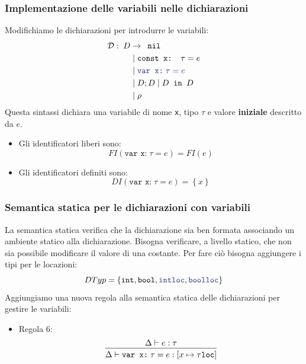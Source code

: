 \documentclass[a4paper]{article}
\begin{document}
\subsubsection{Implementazione delle variabili nelle dichiarazioni}
Modifichiamo le dichiarazioni per introdurre le variabili:
\[
  \begin{aligned}
    \mathcal{D}: \; D & \to  \texttt{ nil}  \\
                      & \mid \texttt{const x: } \tau = e  \\
                      & \mid \mathcolor{Blue}{\texttt{var x:}\; \tau = e} \\
                      & \mid D; D  \mid D \texttt{ in } D \\
                      & \mid \rho
  \end{aligned}
\] 
Questa sintassi dichiara una variabile di nome \texttt{x}, tipo \( \tau \) e valore
\textbf{iniziale} descritto da \( e \).
\begin{itemize}
  \item Gli identificatori liberi sono:
    \[
      FI(\texttt{var x:}\; \tau = e) = FI(e)
    \] 

  \item Gli identificatori definiti sono:
    \[
      DI(\texttt{var x:}\; \tau = e) = \left\{ x \right\}
    \]
\end{itemize}

\subsubsection{Semantica statica per le dichiarazioni con variabili}
La semantica statica verifica che la dichiarazione sia ben formata associando un
ambiente statico alla dichiarazione.
Bisogna verificare, a livello statico, che non sia possibile modificare il valore
di una costante. Per fare ciò bisogna aggiungere i tipi per le locazioni:
\[
  DTyp = \left\{ \texttt{int}, \texttt{bool}, \mathcolor{Blue}{\texttt{intloc}},
  \mathcolor{Blue}{\texttt{boolloc}} \right\}
\] 
Aggiungiamo una nuova regola alla semantica statica delle dichiarazioni
per gestire le variabili:
\begin{itemize}
  \item Regola 6:
    \[
      \begin{prooftree}
        \hypo{ \Delta \vdash e : \tau }
        \infer1{ \Delta \vdash \texttt{var x:}\; \tau = e : \left[ x \mapsto \tau\texttt{loc} \right] }
      \end{prooftree}
    \] 
\end{itemize}
\end{document}
